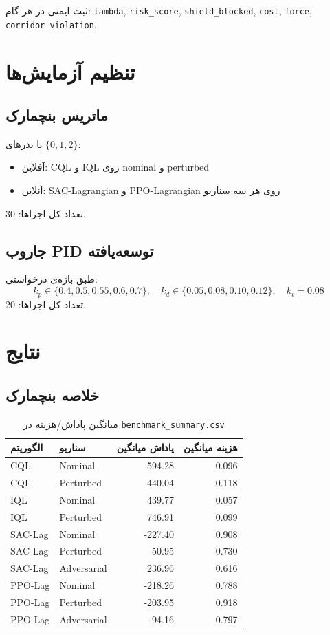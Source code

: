 \documentclass[conference]{IEEEtran}
\begin{document}
ثبت ایمنی در هر گام:
\texttt{lambda}, \texttt{risk\_score}, \texttt{shield\_blocked},
\texttt{cost}, \texttt{force}, \texttt{corridor\_violation}.

\section{تنظیم آزمایش‌ها}
\subsection{ماتریس بنچمارک}
با بذرهای \(\{0,1,2\}\):
\begin{itemize}
  \item آفلاین: CQL و IQL روی nominal و perturbed
  \item آنلاین: SAC-Lagrangian و PPO-Lagrangian روی هر سه سناریو
\end{itemize}
تعداد کل اجراها: 30.

\subsection{جاروب PID توسعه‌یافته}
طبق بازه‌ی درخواستی:
\[
k_p \in \{0.4, 0.5, 0.55, 0.6, 0.7\},\quad
k_d \in \{0.05, 0.08, 0.10, 0.12\},\quad
k_i = 0.08
\]
تعداد کل اجراها: 20.

\section{نتایج}
\subsection{خلاصه بنچمارک}
\begin{table}[!t]
\centering
\caption{میانگین پاداش/هزینه در \texttt{benchmark\_summary.csv}}
\begin{tabular}{llrr}
\toprule
الگوریتم & سناریو & پاداش میانگین & هزینه میانگین \\
\midrule
CQL & Nominal & 594.28 & 0.096 \\
CQL & Perturbed & 440.04 & 0.118 \\
IQL & Nominal & 439.77 & 0.057 \\
IQL & Perturbed & 746.91 & 0.099 \\
\midrule
SAC-Lag & Nominal & -227.40 & 0.908 \\
SAC-Lag & Perturbed & 50.95 & 0.730 \\
SAC-Lag & Adversarial & 236.96 & 0.616 \\
\midrule
PPO-Lag & Nominal & -218.26 & 0.788 \\
PPO-Lag & Perturbed & -203.95 & 0.918 \\
PPO-Lag & Adversarial & -94.16 & 0.797 \\
\bottomrule
\end{tabular}
\end{table}
\end{document}
